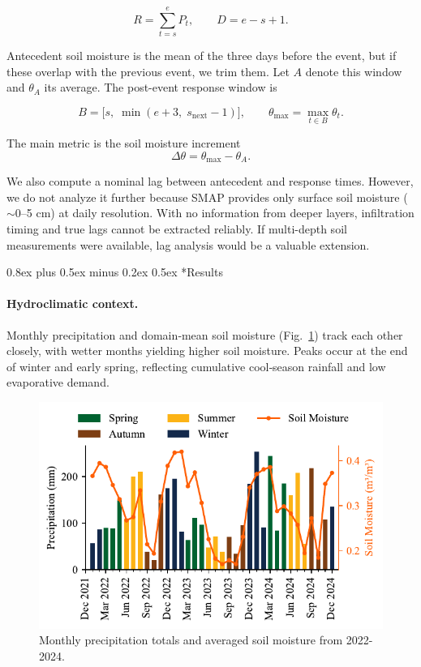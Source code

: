 \documentclass[twocolumn]{article}
\makeatletter
\renewcommand\section{\@startsection{section}{1}{0pt}%
  {0.8ex plus 0.5ex minus 0.2ex}%
  {0.5ex}%
  {\normalfont\large\bfseries}}
\makeatother
\begin{document}
\[
R = \sum_{t=s}^{e} P_t, 
\qquad 
D = e - s + 1.
\]

Antecedent soil moisture is the mean of the three days before the event, but if these overlap with the previous event, we trim them. Let \(A\) denote this window and \(\theta_A\) its average. The post-event response window is  

\[
B = \big[s,\; \min(e+3,\; s_{\mathrm{next}}-1)\big],
\qquad 
\theta_{\max} = \max_{t \in B} \theta_t .
\]

The main metric is the soil moisture increment  
\[
\Delta \theta = \theta_{\max} - \theta_A .
\]

We also compute a nominal lag between antecedent and response times. However, we do not analyze it further because SMAP provides only surface soil moisture (\(\sim\)0--5 cm) at daily resolution. With no information from deeper layers, infiltration timing and true lags cannot be extracted reliably. If multi-depth soil measurements were available, lag analysis would be a valuable extension.  

\section*{Results}

\paragraph{Hydroclimatic context.}
Monthly precipitation and domain‐mean soil moisture (Fig.~\ref{fig:monthly_precip_sm}) track each other closely, with wetter months yielding higher soil moisture. Peaks occur at the end of winter and early spring, reflecting cumulative cool‐season rainfall and low evaporative demand.

\begin{figure}[!h]
  \centering
  \includegraphics[width=1\columnwidth]{monthly_precip_sm}
  \caption{Monthly precipitation totals and averaged soil moisture from 2022-2024.}
  \label{fig:monthly_precip_sm}
\end{figure}
\end{document}

